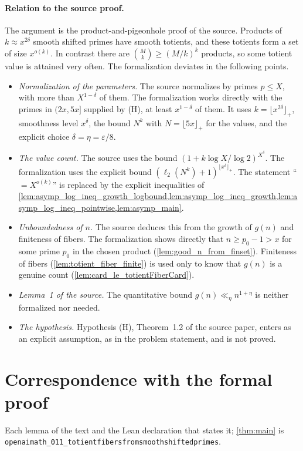 \documentclass[11pt]{article}
\theoremstyle{definition}
\theoremstyle{remark}
\newcommand{\floorp}[1]{\lfloor #1\rfloor_{+}}
\newcommand{\ltwo}{\ell_{2}}
\begin{document}
\paragraph{Relation to the source proof.}
The argument is the product-and-pigeonhole proof of the source. Products of $k\approx x^{2\delta}$ smooth shifted primes have smooth totients, and these totients form a set of size $x^{o(k)}$. In contrast there are $\binom{M}{k}\ge(M/k)^k$ products, so some totient value is attained very often. The formalization deviates in the following points.

\begin{itemize}
\item \emph{Normalization of the parameters.} The source normalizes by primes $p\le X$, with more than $X^{1-\delta}$ of them. The formalization works directly with the primes in $(2x,5x]$ supplied by (H), at least $x^{1-\delta}$ of them. It uses $k=\floorp{x^{2\delta}}$, smoothness level $x^\delta$, the bound $N^k$ with $N=\floorp{5x}$ for the values, and the explicit choice $\delta=\eta=\varepsilon/8$.
\item \emph{The value count.} The source uses the bound $(1+k\log X/\log2)^{X^\delta}$. The formalization uses the explicit bound $(\ltwo(N^k)+1)^{\floorp{x^\delta}}$. The statement ``$=X^{o(k)}$'' is replaced by the explicit inequalities of \cref{lem:asymp_log_ineq_growth_logbound,lem:asymp_log_ineq_growth,lem:asymp_log_ineq_pointwise,lem:asymp_main}.
\item \emph{Unboundedness of $n$.} The source deduces this from the growth of $g(n)$ and finiteness of fibers. The formalization shows directly that $n\ge p_0-1>x$ for some prime $p_0$ in the chosen product (\cref{lem:good_n_from_finset}). Finiteness of fibers (\cref{lem:totient_fiber_finite}) is used only to know that $g(n)$ is a genuine count (\cref{lem:card_le_totientFiberCard}).
\item \emph{Lemma~1 of the source.} The quantitative bound $g(n)\ll_\eta n^{1+\eta}$ is neither formalized nor needed.
\item \emph{The hypothesis.} Hypothesis (H), Theorem~1.2 of the source paper, enters as an explicit assumption, as in the problem statement, and is not proved.
\end{itemize}

\appendix
\section{Correspondence with the formal proof}
Each lemma of the text and the Lean declaration that states it; \cref{thm:main} is \texttt{openaimath\_011\_totientfibersfromsmoothshiftedprimes}.
\end{document}
